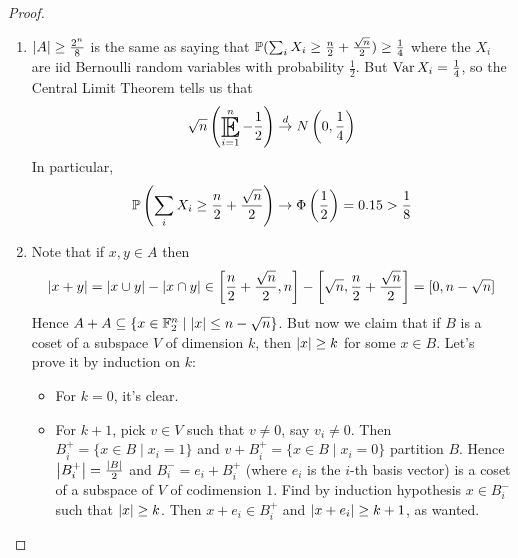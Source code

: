 \documentclass{article}
\begin{document}
\begin{proof}~
  \begin{enumerate}
    \item $\abs A \ge \frac{2^n}8$ is the same as saying that $\P(\sum_i X_i \ge \frac n2 + \frac{\sqrt n}2) \ge \frac 14$ where the $X_i$ are iid Bernoulli random variables with probability $\frac 12$. But $\Var X_i = \frac 14$, so the Central Limit Theorem tells us that
    $$\sqrt n\left(\E_{i = 1}^n - \frac 12\right) \overset d\to N\left(0, \frac 14\right)$$
    In particular,
    $$\P\left(\sum_i X_i \ge \frac n2 + \frac{\sqrt n}2\right) \to \Phi\left(\frac 12\right) = 0.15 > \frac 18$$
    \item Note that if $x, y \in A$ then
    $$\abs{x + y} = \abs{x \union y} - \abs{x \inter y} \in \left[\frac n2 + \frac{\sqrt n}2, n\right] - \left[\sqrt n, \frac n2 + \frac{\sqrt n}2\right] = [0, n - \sqrt n]$$
    Hence $A + A \subseteq \{x \in \F_2^n \mid \abs x \le n - \sqrt n\}$. But now we claim that if $B$ is a coset of a subspace $V$ of dimension $k$, then $\abs x \ge k$ for some $x \in B$. Let's prove it by induction on $k$:
    \begin{itemize}
      \item For $k = 0$, it's clear.
      \item For $k + 1$, pick $v \in V$ such that $v \ne 0$, say $v_i \ne 0$. Then $B_i^+ = \{x \in B \mid x_i = 1\}$ and $v + B_i^+ = \{x \in B \mid x_i = 0\}$ partition $B$. Hence $\abs{B_i^+} = \frac{\abs B}2$ and $B_i^- = e_i + B_i^+$ (where $e_i$ is the $i$-th basis vector) is a coset of a subspace of $V$ of codimension $1$. Find by induction hypothesis $x \in B_i^-$ such that $\abs x \ge k$. Then $x + e_i \in B_i^+$ and $\abs{x + e_i} \ge k + 1$, as wanted.
    \end{itemize}
  \end{enumerate}
\end{proof}
\end{document}
